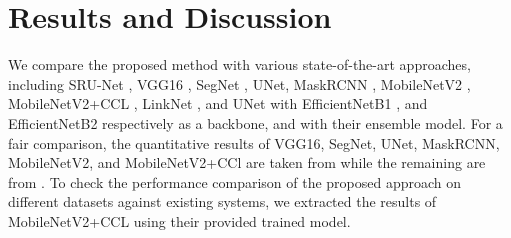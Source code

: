 \documentclass[review]{elsarticle}
\begin{document}
\section{Results and Discussion}
We compare the proposed method with various state-of-the-art approaches, including SRU-Net \cite{aldoulah2025swishres}, VGG16 \cite{simonyan2014very}, SegNet \cite{badrinarayanan2017segnet}, UNet\cite{ronneberger2015u}, MaskRCNN \cite{he2017mask}, MobileNetV2 \cite{sandler2018mobilenetv2}, MobileNetV2+CCL \cite{wang2020fully}, LinkNet \cite{chaurasia2017linknet}, and UNet \cite{ronneberger2015u} with EfficientNetB1 \cite{tan2019efficientnet}, and EfficientNetB2 \cite{tan2019efficientnet} respectively as a backbone, and with their ensemble model. For a fair comparison, the quantitative results of VGG16, SegNet, UNet, MaskRCNN, MobileNetV2, and MobileNetV2+CCl are taken from \cite{wang2020fully} while the remaining are from \cite{mahbod2021automatic}. To check the performance comparison of the proposed approach on different datasets against existing systems, we extracted the results of MobileNetV2+CCL using their provided trained model.
\end{document}
